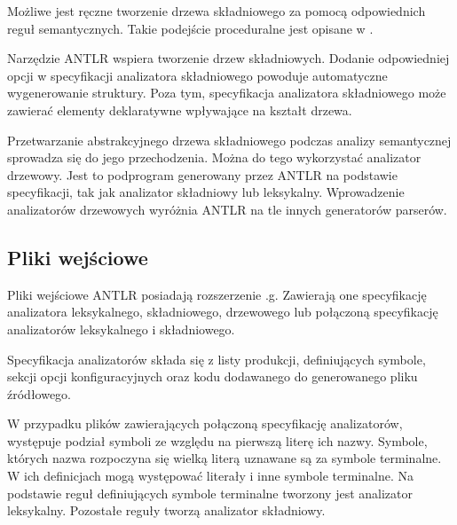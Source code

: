 
Możliwe jest ręczne tworzenie drzewa składniowego za pomocą odpowiednich
reguł semantycznych. Takie podejście proceduralne jest opisane w \cite{compilers}.

Narzędzie ANTLR wspiera tworzenie drzew składniowych. Dodanie
odpowiedniej opcji w specyfikacji analizatora składniowego powoduje automatyczne
wygenerowanie struktury. Poza tym, specyfikacja analizatora składniowego
 może zawierać elementy deklaratywne wpływające na kształt drzewa.


Przetwarzanie abstrakcyjnego drzewa składniowego podczas analizy semantycznej
sprowadza się do jego przechodzenia. Można do tego wykorzystać analizator drzewowy. 
Jest to podprogram generowany przez
ANTLR na podstawie specyfikacji, tak jak analizator składniowy lub leksykalny.
Wprowadzenie analizatorów drzewowych wyróżnia ANTLR na tle innych generatorów
 parserów. 

\subsection{Pliki wejściowe}

Pliki wejściowe ANTLR posiadają rozszerzenie .g. Zawierają one specyfikację
analizatora leksykalnego, składniowego, drzewowego lub połączoną specyfikację
analizatorów leksykalnego i składniowego. 

Specyfikacja analizatorów składa się z listy produkcji, definiujących symbole,
 sekcji opcji konfiguracyjnych oraz kodu dodawanego do generowanego
pliku źródłowego.

W przypadku plików zawierających połączoną specyfikację analizatorów, występuje
podział symboli ze względu na pierwszą literę ich nazwy.
 Symbole, których nazwa rozpoczyna się wielką literą uznawane są
za symbole terminalne. W ich definicjach mogą występować literały i inne
symbole terminalne. Na podstawie reguł definiujących symbole terminalne
tworzony jest analizator leksykalny. Pozostałe reguły tworzą analizator
składniowy.

